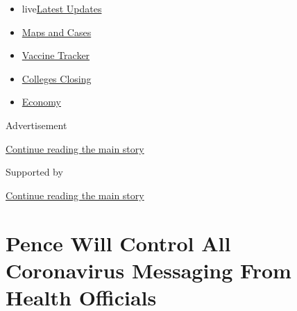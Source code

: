 \begin{itemize}
\tightlist
\item
  live\href{https://www.nytimes3xbfgragh.onion/2020/08/20/world/coronavirus-covid.html?name=styln-coronavirus-national\&region=TOP_BANNER\&variant=undefined\&block=storyline_menu_recirc\&action=click\&pgtype=Article\&impression_id=63e11ce1-e38e-11ea-aa92-b162d5bed6a1}{Latest
  Updates}
\item
  \href{https://www.nytimes3xbfgragh.onion/interactive/2020/us/coronavirus-us-cases.html?name=styln-coronavirus-national\&region=TOP_BANNER\&variant=undefined\&block=storyline_menu_recirc\&action=click\&pgtype=Article\&impression_id=63e143f0-e38e-11ea-aa92-b162d5bed6a1}{Maps
  and Cases}
\item
  \href{https://www.nytimes3xbfgragh.onion/interactive/2020/science/coronavirus-vaccine-tracker.html?name=styln-coronavirus-national\&region=TOP_BANNER\&variant=undefined\&block=storyline_menu_recirc\&action=click\&pgtype=Article\&impression_id=63e143f1-e38e-11ea-aa92-b162d5bed6a1}{Vaccine
  Tracker}
\item
  \href{https://www.nytimes3xbfgragh.onion/2020/08/19/us/colleges-closing-covid.html?name=styln-coronavirus-national\&region=TOP_BANNER\&variant=undefined\&block=storyline_menu_recirc\&action=click\&pgtype=Article\&impression_id=63e143f2-e38e-11ea-aa92-b162d5bed6a1}{Colleges
  Closing}
\item
  \href{https://www.nytimes3xbfgragh.onion/live/2020/08/20/business/stock-market-today-coronavirus?name=styln-coronavirus-national\&region=TOP_BANNER\&variant=undefined\&block=storyline_menu_recirc\&action=click\&pgtype=Article\&impression_id=63e143f3-e38e-11ea-aa92-b162d5bed6a1}{Economy}
\end{itemize}

Advertisement

\protect\hyperlink{after-top}{Continue reading the main story}

Supported by

\protect\hyperlink{after-sponsor}{Continue reading the main story}

\hypertarget{pence-will-control-all-coronavirus-messaging-from-health-officials}{%
\section{Pence Will Control All Coronavirus Messaging From Health
Officials}\label{pence-will-control-all-coronavirus-messaging-from-health-officials}}

